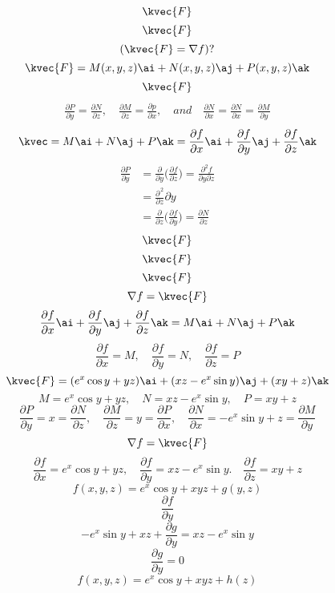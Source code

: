 \[\kvec{F}\]
\[\kvec{F}\]
\[(\kvec{F}=\nabla f)?\]
\[\kvec{F}=M(x,y,z)\ai+N(x,y,z)\aj+P(x,y,z)\ak\]
\[\kvec{F}\]
\begin{align*}
\frac{\partial P}{\partial y}=\frac{\partial N}{\partial z}, \quad \frac{\partial M}{\partial z}=\frac{\partial p}{\partial x}, \quad and \quad \frac{\partial N}{\partial x}=\frac{\partial N}{\partial x}=\frac{\partial M}{\partial y}
\end{align*}
\begin{align*}
\kvec=M\ai+N\aj+P\ak=\frac{\partial f}{\partial x}\ai+\frac{\partial f}{\partial y}\aj+\frac{\partial f}{\partial z}\ak
\end{align*}
\begin{align*}
\frac{\partial P}{\partial y}&=\frac{\partial}{\partial y}\big(\frac{\partial f}{\partial z}\big)=\frac{\partial^{2} f}{\partial y \partial z}\\
&=\frac{\partial^{\,2}}{\partial z} {\partial y}\\
&=\frac{\partial}{\partial z}\big(\frac{\partial f}{\partial y}\big)=\frac{\partial N}{\partial z}
\end{align*}
\[ \kvec{F}\]
\[ \kvec{F}\]
\[ \kvec{F}\]
\[\nabla f = \kvec{F}\]
\[\frac{\partial f}{\partial x} \ai + \frac{\partial f}{\partial y} \aj +\frac{\partial f}{\partial z} \ak =M\ai + N\aj +P\ak\]
\[\frac{\partial f}{\partial x} =M, \quad \frac{\partial f}{\partial y}=N, \quad \frac{
\partial f}{\partial z}=P\]
\[\kvec{F}=(e^{x} \cos y + yz)\ai +(xz - e^{x}\sin y)\aj + (xy+z)\ak\]
\[M=e^{x}\cos y +yz,\quad N=xz-e^{x}\sin y,\quad P=xy+z\]
\[\frac{\partial P}{\partial y}=x=\frac{\partial N}{\partial z},\quad \frac{\partial M}{\partial z}=y=\frac{\partial P}{\partial x},\quad \frac{\partial N}{\partial x} = -e^{x}\sin y +z=\frac{\partial M}{\partial y}\]
\[ \nabla f = \kvec{F}\]
\[\frac{\partial f}{\partial x}=e^{x}\cos y +yz,\quad \frac{\partial f}{\partial y}=xz-e^{x}\sin y. \quad \frac{\partial f}{\partial z}=xy+z\]
\[f(x,y,z)=e^{x} \cos y + xyz + g(y,z)\]
\[\frac{\partial f}{\partial y}\]
\[ -e^{x} \sin y +xz + \frac{\partial g}{\partial y}=xz-e^{x} \sin y\]
\[\frac{\partial g}{\partial y} = 0\]
\[ f(x,y,z)= e^{x} \cos y + xyz +h(z)\]

















